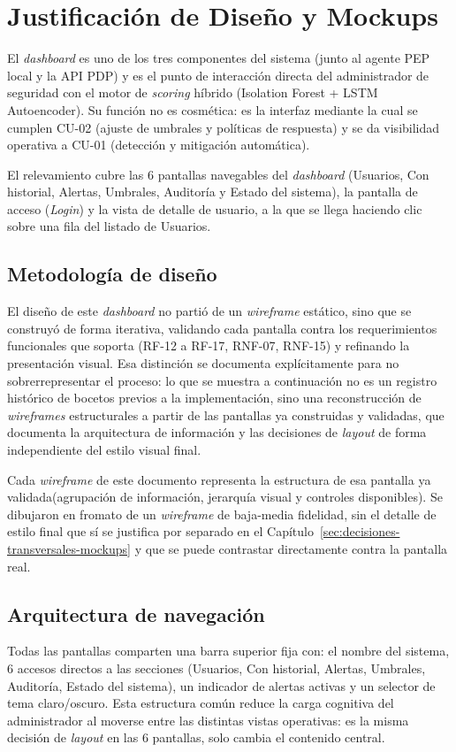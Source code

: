 

\chapter{Justificación de Diseño y Mockups}
El \emph{dashboard} es uno de los tres componentes del sistema (junto al agente PEP local y la API PDP) y es el punto de interacción directa del administrador de seguridad con el motor de \emph{scoring} híbrido (Isolation Forest + LSTM Autoencoder). Su función no es cosmética: es la interfaz mediante la cual se cumplen CU-02 (ajuste de umbrales y políticas de respuesta) y se da visibilidad operativa a CU-01 (detección y mitigación automática).

El relevamiento cubre las 6 pantallas navegables del \emph{dashboard} (Usuarios, Con historial, Alertas, Umbrales, Auditoría y Estado del sistema), la pantalla de acceso (\emph{Login}) y la vista de detalle de usuario, a la que se llega haciendo clic sobre una fila del listado de Usuarios.

\section{Metodología de diseño}
El diseño de este \emph{dashboard} no partió de un \emph{wireframe} estático, sino que se construyó de forma iterativa, validando cada pantalla contra los requerimientos funcionales que soporta (RF-12 a RF-17, RNF-07, RNF-15) y refinando la presentación visual. Esa distinción se documenta explícitamente para no sobrerrepresentar el proceso: lo que se muestra a continuación no es un registro histórico de bocetos previos a la implementación, sino una reconstrucción de \emph{wireframes} estructurales a partir de las pantallas ya construidas y validadas, que documenta la arquitectura de información y las decisiones de \emph{layout} de forma independiente del estilo visual final.

Cada \emph{wireframe} de este documento representa la estructura de esa pantalla ya validada(agrupación de información, jerarquía visual y controles disponibles). Se dibujaron en fromato de un \emph{wireframe} de baja-media fidelidad, sin el detalle de estilo final que sí se justifica por separado en el Capítulo~\ref{sec:decisiones-transversales-mockups} y que se puede contrastar directamente contra la pantalla real.

\section{Arquitectura de navegación}
Todas las pantallas comparten una barra superior fija con: el nombre del sistema, 6 accesos directos a las secciones (Usuarios, Con historial, Alertas, Umbrales, Auditoría, Estado del sistema), un indicador de alertas activas y un selector de tema claro/oscuro. Esta estructura común reduce la carga cognitiva del administrador al moverse entre las distintas vistas operativas: es la misma decisión de \emph{layout} en las 6 pantallas, solo cambia el contenido central.

